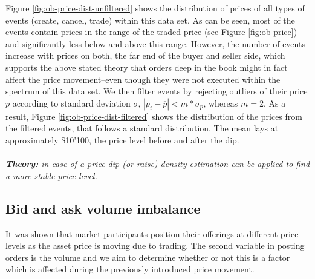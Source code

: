 Figure \ref{fig:ob-price-dist-unfiltered} shows the distribution of prices of all types of events (create, cancel, trade) within this data set.
As can be seen, most of the events contain prices in the range of the traded price (see Figure \ref{fig:ob-price}) and significantly less below and above this range.
However, the number of events increase with prices on both, the far end of the buyer and seller side, which supports the above stated theory that orders deep in the book might in fact affect the price movement--even though they were not executed within the spectrum of this data set.
We then filter events by rejecting outliers of their price $p$ according to standard deviation $\sigma$, $ |p_i - \overline{p}| < m * \sigma_{p} $, whereas $m=2$.
As a result, Figure \ref{fig:ob-price-dist-filtered} shows the distribution of the prices from the filtered events, that follows a standard distribution.
The mean lays at approximately \$10'100, the price level before and after the dip.
\\
\\
\textit{\textbf{Theory:} in case of a price dip (or raise) density estimation can be applied to find a more stable price level.}

\subsection{Bid and ask volume imbalance}

It was shown that market participants position their offerings at different price levels as the asset price is moving due to trading.
The second variable in posting orders is the volume and we aim to determine whether or not this is a factor which is affected during the previously introduced price movement.

